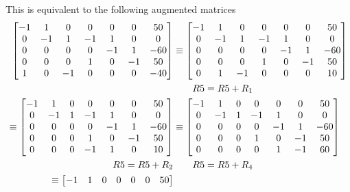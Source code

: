\documentclass{../mathhomework}
\newenvironment{Mat}{\begin{bmatrix}}{\end{bmatrix}}
\begin{document}
\begin{problem}[1.6\#13]
\begin{solution}[Part A:]
        This is equivalent to the following augmented matrices
        \begin{align*}
            \begin{Mat}
                -1 & 1 & 0 & 0 & 0 & 0 & 50 \\ 
                0 & -1 & 1 & -1 & 1 & 0 & 0 \\
                0 & 0 & 0 & 0 & -1 & 1 & -60 \\
                0 & 0 & 0 & 1 & 0 & -1 & 50 \\ 
                1 & 0 & -1 & 0 & 0 & 0 & -40
            \end{Mat}
            & \equiv \begin{Mat}
                -1 & 1 & 0 & 0 & 0 & 0 & 50 \\ 
                0 & -1 & 1 & -1 & 1 & 0 & 0 \\
                0 & 0 & 0 & 0 & -1 & 1 & -60 \\
                0 & 0 & 0 & 1 & 0 & -1 & 50 \\ 
                0 & 1 & -1 & 0 & 0 & 0 & 10
            \end{Mat} 
            \\
            & \qquad{} R5 = R5 + R_1 \\
            \equiv \begin{Mat}
                -1 & 1 & 0 & 0 & 0 & 0 & 50 \\ 
                0 & -1 & 1 & -1 & 1 & 0 & 0 \\
                0 & 0 & 0 & 0 & -1 & 1 & -60 \\
                0 & 0 & 0 & 1 & 0 & -1 & 50 \\ 
                0 & 0 & 0 & -1 & 1 & 0 & 10
            \end{Mat}
            & \equiv \begin{Mat}
                -1 & 1 & 0 & 0 & 0 & 0 & 50 \\ 
                0 & -1 & 1 & -1 & 1 & 0 & 0 \\
                0 & 0 & 0 & 0 & -1 & 1 & -60 \\
                0 & 0 & 0 & 1 & 0 & -1 & 50 \\ 
                0 & 0 & 0 & 0 & 1 & -1 & 60
            \end{Mat}
            \\ 
            R5 = R5 + R_2 & \qquad{} R5 = R5 + R_4 \\ 
            \equiv \begin{Mat}
                -1 & 1 & 0 & 0 & 0 & 0 & 50 \\ 

\end{Mat}
\end{align*}
\end{solution}
\end{problem}
\end{document}
